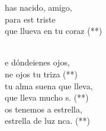 \documentclass[12pt]{article}
\begin{document}
\begin{multicols*}{2}
\begin{cancion}%
	\begin{chorus}%
	has nacido, amigo,\\
	para est triste\\
	que llueva en tu coraz (**)\\
	\end{chorus}%
	\jump\\
	e dóndeienes ojos,\\
	ne ojos tu triza (**)\\
\jump
	tu alma suena  que lleva,\\
	que lleva mucho s. (**)\\
\jump
	os tenemos a estrella,\\
	 estrella de luz nca. (**)\\
\end{cancion}%


\end{multicols*}
\end{document}
